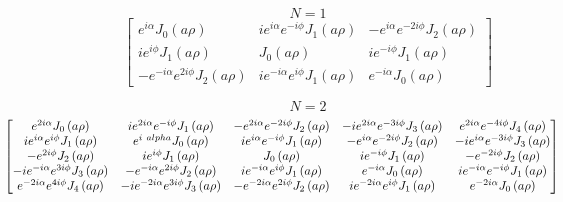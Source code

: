 \documentclass{article}
\begin{document}
$$N=1$$
\[
\left[\begin{matrix}e^{i \alpha} J_{0}\left(a \rho\right) & i e^{i \alpha} e^{- i \phi} J_{1}\left(a \rho\right) & - e^{i \alpha} e^{- 2 i \phi} J_{2}\left(a \rho\right)\\i e^{i
 \phi} J_{1}\left(a \rho\right) & J_{0}\left(a \rho\right) & i e^{- i \phi} J_{1}\left(a \rho\right)\\- e^{- i \alpha} e^{2 i \phi} J_{2}\left(a \rho\right) & i e^{- i \alpha} e
^{i \phi} J_{1}\left(a \rho\right) & e^{- i \alpha} J_{0}\left(a \rho\right)\end{matrix}\right]
\]

$$N=2$$
\[
\hspace{-1.5cm}
\left[\begin{matrix}e^{2 i \alpha} J_{0}\left(a \rho\right) & i e^{2 i \alpha} e^{- i \phi} J_{1}\left(a \rho\right) & - e^{2 i \alpha} e^{- 2 i \phi} J_{2}\left(a \rho\right) &
 - i e^{2 i \alpha} e^{- 3 i \phi} J_{3}\left(a \rho\right) & e^{2 i \alpha} e^{- 4 i \phi} J_{4}\left(a \rho\right)\\i e^{i \alpha} e^{i \phi} J_{1}\left(a \rho\right) & e^{i \
alpha} J_{0}\left(a \rho\right) & i e^{i \alpha} e^{- i \phi} J_{1}\left(a \rho\right) & - e^{i \alpha} e^{- 2 i \phi} J_{2}\left(a \rho\right) & - i e^{i \alpha} e^{- 3 i \phi}
 J_{3}\left(a \rho\right)\\- e^{2 i \phi} J_{2}\left(a \rho\right) & i e^{i \phi} J_{1}\left(a \rho\right) & J_{0}\left(a \rho\right) & i e^{- i \phi} J_{1}\left(a \rho\right) &
 - e^{- 2 i \phi} J_{2}\left(a \rho\right)\\- i e^{- i \alpha} e^{3 i \phi} J_{3}\left(a \rho\right) & - e^{- i \alpha} e^{2 i \phi} J_{2}\left(a \rho\right) & i e^{- i \alpha}
e^{i \phi} J_{1}\left(a \rho\right) & e^{- i \alpha} J_{0}\left(a \rho\right) & i e^{- i \alpha} e^{- i \phi} J_{1}\left(a \rho\right)\\e^{- 2 i \alpha} e^{4 i \phi} J_{4}\left(
a \rho\right) & - i e^{- 2 i \alpha} e^{3 i \phi} J_{3}\left(a \rho\right) & - e^{- 2 i \alpha} e^{2 i \phi} J_{2}\left(a \rho\right) & i e^{- 2 i \alpha} e^{i \phi} J_{1}\left(
a \rho\right) & e^{- 2 i \alpha} J_{0}\left(a \rho\right)\end{matrix}\right]
\]
\end{document}
